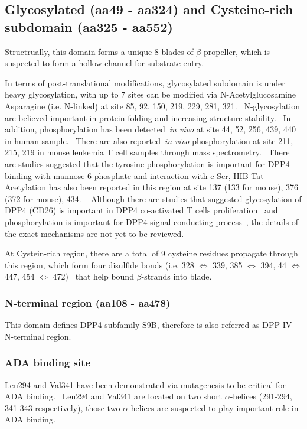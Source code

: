\subsection{Glycosylated (aa49 - aa324) and Cysteine-rich subdomain (aa325 - aa552)}

Structrually, this domain forms a unique 8 blades of $\beta$-propeller, which is suspected to form a hollow channel for substrate entry.

In terms of post-translational modifications, glycosylated subdomain is under heavy glycosylation, with up to 7 sites can be modified via N-Acetylglucosamine Asparagine (i.e. N-linked) at site 85, 92, 150, 219, 229, 281, 321.~\cite{Rasmussen2003,Thoma2003,Meng2010,Chen2009,Hiramatsu2003} N-glycosylation are believed important in protein folding and increasing structure stability.~\cite{Fan_1997} In addition, phosphorylation has been detected~\textit{in vivo} at site 44, 52, 256, 439, 440 in human sample.~\cite{Xia2008, Hornbeck2015, Mertins2014} There are also reported~\textit{in vivo} phosphorylation at site 211, 215, 219 in mouse leukemia T cell samples through mass spectrometry.~\cite{Hornbeck2015} There are studies suggested that the tyrosine phosphorylation is important for DPP4 binding with mannose 6-phosphate and interaction with c-Scr, HIB-Tat
Acetylation has also been reported in this region at site 137 (133 for mouse), 376 (372 for mouse), 434. ~\cite{Lundby2012,Weinert2013} Although there are studies that suggested glycosylation of DPP4 (CD26) is important in DPP4 co-activated T cells proliferation~\cite{Ikushima_2000} and phosphorylation is important for DPP4 signal conducting process~\cite{Ishii_2001}, the details of the exact mechanisms are not yet to be reviewed.
\par
At Cystein-rich region, there are a total of 9 cysteine residues propagate through this region, which form four disulfide bonds (i.e. 328 $\Leftrightarrow$ 339, 385 $\Leftrightarrow$ 394, 44 $\Leftrightarrow$ 447, 454 $\Leftrightarrow$ 472)~\cite{Hiramatsu2003} that help bound $\beta$-strands into blade. 

\subsubsection{N-terminal region (aa108 - aa478)}

This domain defines DPP4 subfamily S9B, therefore is also referred as DPP IV N-terminal region. 

\subsubsection{ADA binding site}
Leu294 and Val341 have been demonstrated via mutagenesis to be critical for ADA binding.~\cite{Abbott_1999} Leu294 and Val341 are located on two short $\alpha$-helices (291-294, 341-343 respectively), those two $\alpha$-helices are suspected to play important role in ADA binding. 